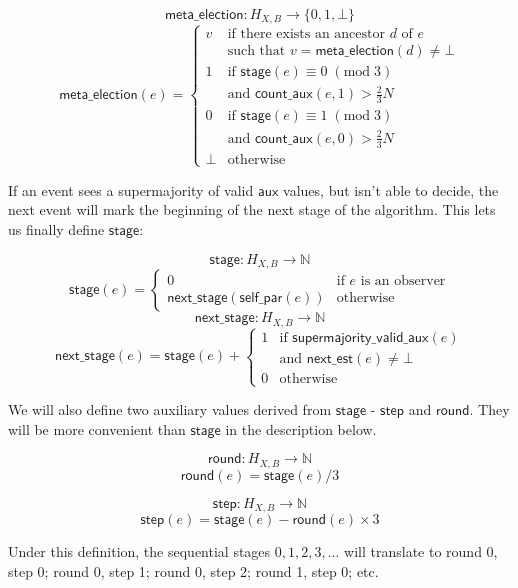 \documentclass[a4paper,fleqn]{article}
\begin{document}
\[ \mathsf{meta\_election}: H_{X,B} \to \{0, 1, \bot\} \]
\[ \mathsf{meta\_election}(e) = \left\{ \begin{array}{ll}
	v & \textrm{if there exists an ancestor $d$ of $e$} \\
	& \textrm{such that $v = \mathsf{meta\_election}(d) \neq \bot$} \\
	1 & \textrm{if $\mathsf{stage}(e) \equiv 0\;(\textrm{mod}\;3)$} \\
	& \textrm{and $\mathsf{count\_aux}(e, 1) > \frac{2}{3}N$} \\
	0 & \textrm{if $\mathsf{stage}(e) \equiv 1\;(\textrm{mod}\;3)$} \\
	& \textrm{and $\mathsf{count\_aux}(e, 0) > \frac{2}{3}N$} \\
	\bot & \textrm{otherwise}
\end{array} \right. \]

If an event sees a supermajority of valid $\mathsf{aux}$ values, but isn't able to decide, the next
event will mark the beginning of the next stage of the algorithm. This lets us finally define
$\mathsf{stage}$:

\[ \mathsf{stage}: H_{X,B} \to \mathbb{N} \]
\[ \mathsf{stage}(e) = \left\{ \begin{array}{ll}
	0 & \textrm{if $e$ is an observer} \\
	\mathsf{next\_stage}(\mathsf{self\_par}(e)) & \textrm{otherwise}
\end{array}\right. \]
\[ \mathsf{next\_stage}: H_{X,B} \to \mathbb{N} \]
\[ \mathsf{next\_stage}(e) = \mathsf{stage}(e) + \left\{ \begin{array}{ll}
	1 & \textrm{if $\mathsf{supermajority\_valid\_aux}(e)$} \\
	& \textrm{and $\mathsf{next\_est}(e) \neq \bot$} \\
	0 & \textrm{otherwise}
\end{array}\right.\]

We will also define two auxiliary values derived from $\mathsf{stage}$ - $\mathsf{step}$ and
$\mathsf{round}$. They will be more convenient than $\mathsf{stage}$ in the description below.

\[ \mathsf{round}: H_{X,B} \to \mathbb{N} \]
\[ \mathsf{round}(e) = \mathsf{stage}(e) / 3 \]

\[ \mathsf{step}: H_{X,B} \to \mathbb{N} \]
\[ \mathsf{step}(e) = \mathsf{stage}(e) - \mathsf{round}(e) \times 3 \]

Under this definition, the sequential stages $0,1,2,3,...$ will translate to round 0, step 0; round
0, step 1; round 0, step 2; round 1, step 0; etc.
\end{document}
